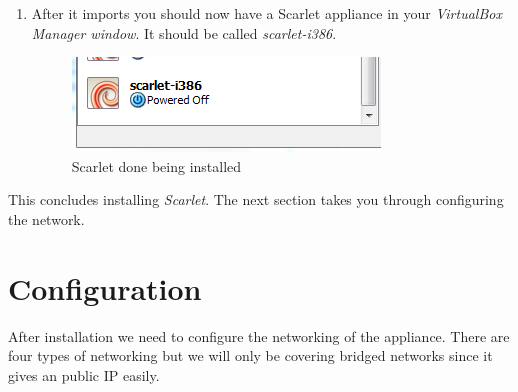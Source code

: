 \documentclass[pdftex,11pt,letterpaper]{article}
\begin{document}
\begin{enumerate}
\item After it imports you should now have a Scarlet appliance in your \textit{VirtualBox Manager window}.  It should be called \textit{scarlet-i386}.

    \begin{figure}[H]
        \begin{center}
        \leavevmode
            \includegraphics[]{scarlet_images/scarlet_finished_importing.png}
        \end{center}
        \caption{Scarlet done being installed}
        \label{fig:scarlet_finished_importing}
    \end{figure}

\end{enumerate}

This concludes installing \textit{Scarlet}. The next section takes you through configuring the network.

\section{Configuration}
\label{sec:configuration}

After installation we need to configure the networking of the appliance.  There are four types of networking but we will only be covering bridged networks since it gives an public IP easily.
\end{document}
